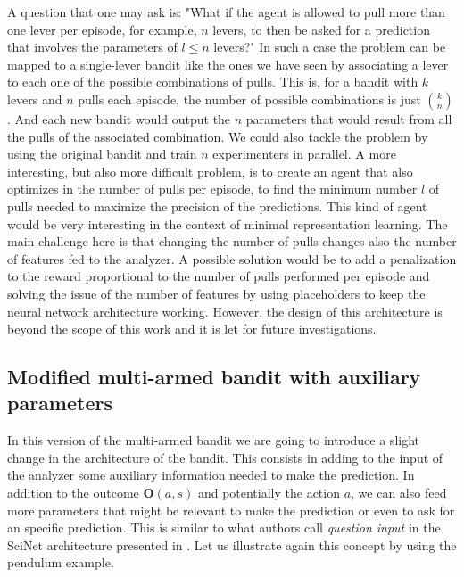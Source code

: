 \documentclass[11pt,a4paper,twoside]{report}
\newcommand{\+}{\textnormal{+} }
\theoremstyle{definition}
\numberwithin{equation}{chapter}
\begin{document}
    A question that one may ask is: "What if the agent is allowed to pull more
    than one lever per episode, for example, $n$ levers, to then be asked for a
    prediction that involves the parameters of $l\leq n$ levers?" In such a case
    the problem can be mapped to a single-lever bandit like the ones we have
    seen by associating a lever to each one of the possible combinations of
    pulls. This is, for a bandit with $k$ levers and $n$ pulls each episode, the
    number of possible combinations is just $k\choose n$.  And each new bandit
    would output the $n$ parameters that would result from all the pulls of the
    associated combination. We could also tackle the problem by using the
    original bandit and train $n$ experimenters in parallel. A more interesting,
    but also more difficult problem, is to create an agent that also optimizes
    in the number of pulls per episode, to find the minimum number $l$ of pulls
    needed to maximize the precision of the predictions. This kind of agent
    would be very interesting in the context of minimal representation learning.
    The main challenge here is that changing the number of pulls changes also
    the number of features fed to the analyzer. A possible solution would be to
    add a penalization to the reward proportional to the number of pulls
    performed per episode and solving the issue of the number of features by
    using placeholders to keep the neural network architecture working. However,
    the design of this architecture is beyond the scope of this work and it is
    let for future investigations.

  \subsection{Modified multi-armed bandit with auxiliary parameters}

  In this version of the multi-armed bandit we are going to introduce a slight
  change in the architecture of the bandit. This consists in adding to the input
  of the analyzer some auxiliary information needed to make the prediction. In
  addition to the outcome $\textbf{O}(a,s)$ and potentially the action $a$, we
  can also feed more parameters that might be relevant to make the prediction or
  even to ask for an specific prediction. This is similar to what authors call
  \textit{question input} in the SciNet architecture presented in
  \cite{iten2020discovering}. Let us illustrate again this concept by using the
  pendulum example.
\end{document}

